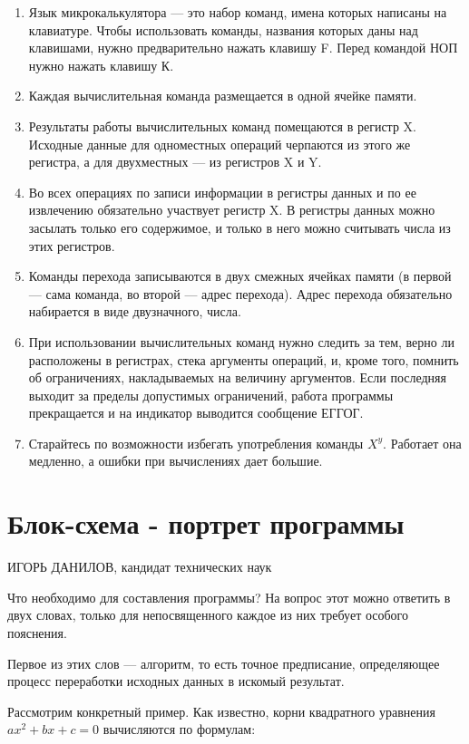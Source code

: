 \documentclass[11pt,a4paper,oneside]{article}
\begin{document}
\begin{enumerate}
\item Язык микрокалькулятора — это набор команд, имена которых написаны на клавиатуре. Чтобы использовать команды, названия которых даны над клавишами, нужно предварительно нажать клавишу F. Перед командой НОП нужно нажать клавишу К.
\item Каждая вычислительная команда размещается в одной ячейке памяти.
\item Результаты работы вычислительных команд помещаются в регистр X. Исходные данные для одноместных операций черпаются из этого же регистра, а для двухместных — из регистров X и Y.
\item Во всех операциях по записи информации в регистры данных и по ее извлечению обязательно участвует регистр X. В регистры данных можно засылать только его содержимое, и только в него можно считывать числа из этих регистров.
\item Команды перехода записываются в двух смежных ячейках памяти (в первой — сама команда, во второй — адрес перехода). Адрес перехода обязательно набирается в виде двузначного, числа.
\item При использовании вычислительных команд нужно следить за тем, верно ли расположены в регистрах, стека аргументы операций, и, кроме того, помнить об ограничениях, накладываемых на величину аргументов. Если последняя выходит за пределы допустимых ограничений, работа программы прекращается и на индикатор выводится сообщение ЕГГОГ.
\item Старайтесь по возможности избегать употребления команды $X^{y}$. Работает она медленно, а ошибки при вычислениях дает большие.
\end{enumerate}

\section{Блок-схема - портрет программы}

ИГОРЬ ДАНИЛОВ, кандидат технических наук

Что необходимо для составления программы? На вопрос этот можно ответить в двух словах, только для непосвященного каждое из них требует особого пояснения.

Первое из этих слов — алгоритм, то есть точное предписание, определяющее процесс переработки исходных данных в искомый результат.

Рассмотрим конкретный пример. Как известно, корни квадратного уравнения $ax^{2}+bx+c=0$ вычисляются по формулам:
\end{document}
